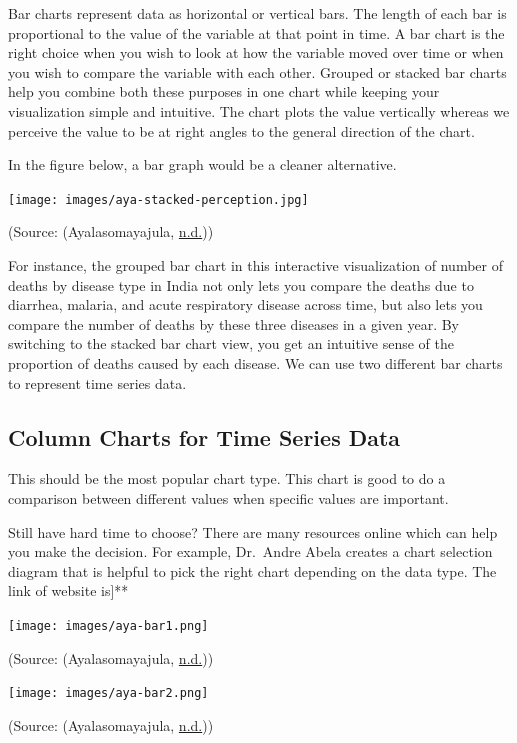 \documentclass[]{book}
\begin{document}
Bar charts represent data as horizontal or vertical bars. The length of each bar is proportional to the value of the variable at that point in time. A bar chart is the right choice when you wish to look at how the variable moved over time or when you wish to compare the variable with each other. Grouped or stacked bar charts help you combine both these purposes in one chart while keeping your visualization simple and intuitive. The chart plots the value vertically whereas we perceive the value to be at right angles to the general direction of the chart.

In the figure below, a bar graph would be a cleaner alternative.

\texttt{[image: images/aya-stacked-perception.jpg]}

(Source: (Ayalasomayajula, \protect\hyperlink{ref-aya-time-series}{n.d.}))

For instance, the grouped bar chart in this interactive visualization of number of deaths by disease type in India not only lets you compare the deaths due to diarrhea, malaria, and acute respiratory disease across time, but also lets you compare the number of deaths by these three diseases in a given year. By switching to the stacked bar chart view, you get an intuitive sense of the proportion of deaths caused by each disease.
We can use two different bar charts to represent time series data.

\hypertarget{column-charts-for-time-series-data}{%
\subsection{Column Charts for Time Series Data}\label{column-charts-for-time-series-data}}

This should be the most popular chart type. This chart is good to do a comparison between different values when specific values are important.

Still have hard time to choose? There are many resources online which can help you make the decision. For example, Dr.~Andre Abela creates a chart selection diagram that is helpful to pick the right chart depending on the data type. The link of website is{]}**

\texttt{[image: images/aya-bar1.png]}

(Source: (Ayalasomayajula, \protect\hyperlink{ref-aya-time-series}{n.d.}))

\texttt{[image: images/aya-bar2.png]}

(Source: (Ayalasomayajula, \protect\hyperlink{ref-aya-time-series}{n.d.}))
\end{document}
